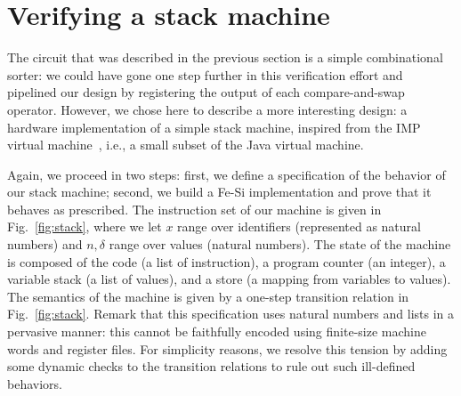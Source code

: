 \documentclass{llncs}
\begin{document}
\section{Verifying a stack machine}
The circuit that was described in the previous section is a simple
combinational sorter: we could have gone one step further in this
verification effort and pipelined our design by registering the output
of each compare-and-swap operator. However, we chose here to describe
a more interesting design: a hardware implementation of a simple stack
machine, inspired from the IMP virtual
machine~\cite{Leroy-Marktoberdorf-09}, i.e., a small subset of the
Java virtual machine.

Again, we proceed in two steps: first, we define a specification of
the behavior of our stack machine; second, we build a Fe-Si
implementation and prove that it behaves as prescribed. 
%
The instruction set of our machine is given in Fig.~\ref{fig:stack},
where we let $x$ range over identifiers (represented as natural
numbers) and $n,\delta$ range over values (natural numbers).
%
The state of the machine is composed of the code (a list of
instruction), a program counter (an integer), a variable stack (a list
of values), and a store (a mapping from variables to values). The
semantics of the machine is given by a one-step transition relation in Fig.~\ref{fig:stack}.
%
Remark that this specification uses natural numbers and lists in a
pervasive manner: this cannot be faithfully encoded using finite-size
machine words and register files. For simplicity reasons, we resolve
this tension by adding some dynamic checks to the transition relations
to rule out such ill-defined behaviors.
\end{document}
